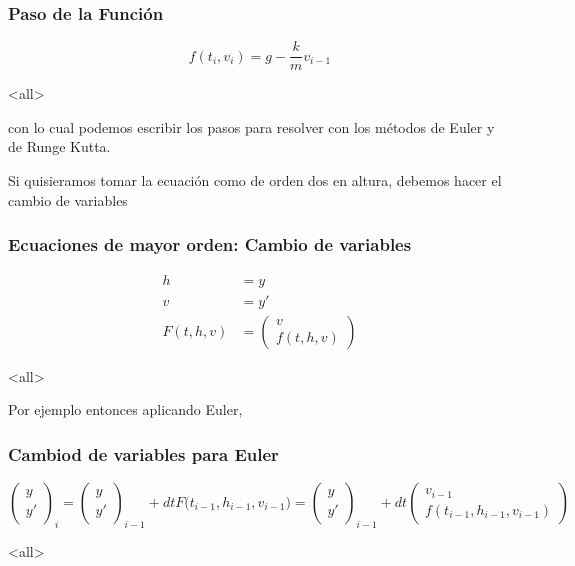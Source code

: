 \mode*
\begin{frame}[label=FramePasoF]
  \frametitle<presentation>{Paso de la Función}
  \begin{equation}\label{EqnFuncParac}
    f(t_i, v_i) = g-\frac{k}{m} v_{i-1}
  \end{equation}
\end{frame}
\mode<all>

\noindent con lo cual podemos escribir los pasos para resolver con los métodos de 
Euler y de Runge Kutta. 

Si quisieramos tomar la ecuación como de orden dos en altura, debemos hacer el cambio
de variables

\mode*
\begin{frame}[label=FrameCambioVariable]
  \frametitle<presentation>{Ecuaciones de mayor orden: Cambio de variables}
  \begin{equation}\label{EqnParacAltura}
    \begin{aligned}
      h &= y\\
      v &= y'\\
      F(t, h, v) &= \begin{pmatrix} v\\ f(t,h, v)    \end{pmatrix}
    \end{aligned}
  \end{equation}
\end{frame}
\mode<all>

Por ejemplo entonces aplicando Euler,

\mode*

\begin{frame}[label=FrameCambioEuler]
  \frametitle<presentation>{Cambiod de variables para Euler}
  \begin{equation}\label{EqnEulerOnHeight}
    \begin{pmatrix}  y \\   y '  \end{pmatrix}_i = 
    \begin{pmatrix}  y \\   y '  \end{pmatrix}_{i-1} +
	dt F \Big( t_{i-1} , h_{i-1}, v_{i-1} \Big)=
    \begin{pmatrix}  y \\   y '  \end{pmatrix}_{i-1} +
      dt \begin{pmatrix} v_{i-1} \\ f(t_{i-1} ,h_{i-1}, v_{i-1} ) \end{pmatrix}
  \end{equation}
\end{frame}


\mode<all>

